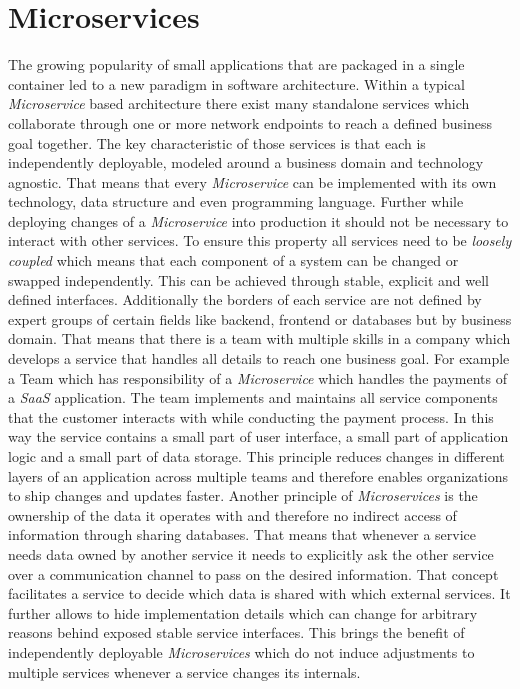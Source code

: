 \section{Microservices}
The growing popularity of small applications that are packaged in a single container led to a new paradigm in software architecture.
Within a typical \textit{Microservice} based architecture there exist many standalone services which collaborate through one or more network endpoints to reach a defined business goal together.
The key characteristic of those services is that each is independently deployable, modeled around a business domain and technology agnostic.
That means that every \textit{Microservice} can be implemented with its own technology, data structure and even programming language.
Further while deploying changes of a \textit{Microservice} into production it should not be necessary to interact with other services.
To ensure this property all services need to be \textit{loosely coupled} which means that each component of a system can be changed or swapped independently.
This can be achieved through stable, explicit and well defined interfaces.
Additionally the borders of each service are not defined by expert groups of certain fields like backend, frontend or databases but by business domain. 
That means that there is a team with multiple skills in a company which develops a service that handles all details to reach one business goal.
For example a Team which has responsibility of a \textit{Microservice} which handles the payments of a \textit{SaaS} application.
The team implements and maintains all service components that the customer interacts with while conducting the payment process.
In this way the service contains a small part of user interface, a small part of application logic and a small part of data storage.
This principle reduces changes in different layers of an application across multiple teams and therefore enables organizations to ship changes and updates faster.
Another principle of \textit{Microservices} is the ownership of the data it operates with and therefore no indirect access of information through sharing databases.
That means that whenever a service needs data owned by another service it needs to explicitly ask the other service over a communication channel to pass on the desired information.
That concept facilitates a service to decide which data is shared with which external services.
It further allows to hide implementation details which can change for arbitrary reasons behind exposed stable service interfaces.
This brings the benefit of independently deployable \textit{Microservices} which do not induce adjustments to multiple services whenever a service changes its internals.

